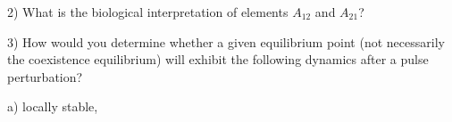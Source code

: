 \documentclass{article}
\begin{document}

\pagebreak

2) What is the biological interpretation of elements $A_{12}$ and $A_{21}$?
\vspace{3cm}


3) How would you determine whether a given equilibrium point (not necessarily the coexistence equilibrium) will exhibit the following dynamics after a pulse perturbation?
\vspace{0.5cm}




a) locally stable,
\vspace{1cm}

\end{document}

